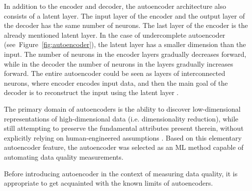 		In addition to the encoder and decoder, the autoencoder architecture also consists of a latent layer. The input layer of the encoder and the output layer of the decoder has the same number of neurons. The last layer of the encoder is the already mentioned latent layer. In the case of undercomplete autoencoder (see~Figure~\ref{fig:autoencoder}), the latent layer has a smaller dimension than the input. The number of neurons in the encoder layers gradually decreases forward, while in the decoder the number of neurons in the layers gradually increases forward. The entire autoencoder could be seen as layers of interconnected neurons, where encoder encodes input data, and then the main goal of the decoder is to reconstruct the input using the latent layer \cite{Purkait2019}.   
		
		
		The primary domain of autoencoders is the ability to discover low-dimensional representations of high-dimensional data (i.e. dimensionality reduction), while still attempting to preserve the fundamental attributes present therein, without explicitly relying on human-engineered assumptions \cite{Purkait2019}. Based on this elementary autoencoder feature, the autoencoder was selected as an ML method capable of automating data quality measurements. 
		
		Before introducing autoencoder in the context of measuring data quality, it is appropriate to get acquainted with the known limits of autoencoders.

